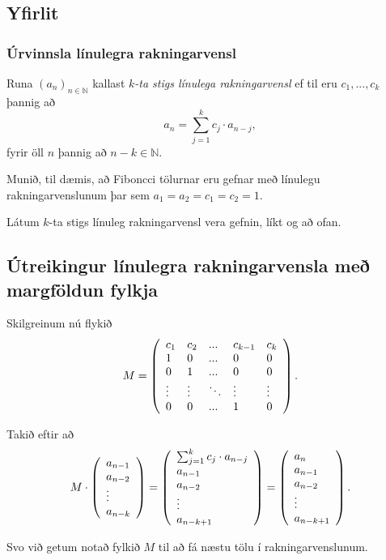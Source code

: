 \subsection{Yfirlit}
{
    \frametitle{Úrvinnsla línulegra rakningarvensl}
    {
        \item<1-> Runa $(a_n)_{n \in \mathbb{N}}$ kallast \emph{$k$-ta stigs línulega rakningarvensl} ef til eru $c_1, ..., c_k$ þannig að
        \[
            a_n = \sum_{j = 1}^k c_j \cdot a_{n - j},
        \]
        fyrir öll $n$ þannig að $n - k \in \mathbb{N}$.
        \item<2-> Munið, til dæmis, að Fiboncci tölurnar eru gefnar með línulegu rakningarvenslunum þar sem $a_1 = a_2 = c_1 = c_2 = 1$.
        \item<3-> Látum $k$-ta stigs línuleg rakningarvensl vera gefnin, líkt og að ofan.
    }
}

\subsection{Útreikingur línulegra rakningarvensla með margföldun fylkja}
{
    {
        \item<1-> Skilgreinum nú flykið
        \[
            M = \left (
            \env{array}
            { {l l l l l}
                c_1 & c_2 & ... & c_{k - 1} & c_k\\
                1 & 0 & ... & 0 & 0\\
                0 & 1 & ... & 0 & 0\\
                \vdots & \vdots & \ddots & \vdots & \vdots\\
                0 & 0 & ... & 1 & 0
            }
            \right ).
        \]
        \item<2-> Takið eftir að
        \[
            M
            \cdot
            \left (
            \env{array}
            { {l}
                a_{n - 1}\\
                a_{n - 2}\\
                \vdots\\
                a_{n - k}
            }
            \right )
            =
            \left (
            \env{array}
            { {l}
                \sum_{j = 1}^k c_j \cdot a_{n - j}\\
                a_{n - 1}\\
                a_{n - 2}\\
                \vdots\\
                a_{n - k + 1}
            }
            \right )
            =
            \left (
            \env{array}
            { {l}
                a_n\\
                a_{n - 1}\\
                a_{n - 2}\\
                \vdots\\
                a_{n - k + 1}
            }
            \right ).
        \]
        \item<3-> Svo við getum notað fylkið $M$ til að fá næstu tölu í rakningarvenslunum.
    }
}

